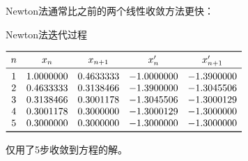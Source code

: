 \documentclass{ctexart}
\begin{document}
Newton法通常比之前的两个线性收敛方法更快：

\begin{table}[htpb]
\centering
\caption{Newton法迭代过程}
$\begin{array}{ccccc}
    \toprule
n & x_n & x_{n+1} & x'_n & x'_{n+1} \\
\midrule
 1 & 1.0000000 & 0.4633333 & -1.0000000 & -1.3900000 \\
 2 & 0.4633333 & 0.3138466 & -1.3900000 & -1.3045506 \\
 3 & 0.3138466 & 0.3001178 & -1.3045506 & -1.3000129 \\
 4 & 0.3001178 & 0.3000000 & -1.3000129 & -1.3000000 \\
 5 & 0.3000000 & 0.3000000 & -1.3000000 & -1.3000000 \\
    \bottomrule
\end{array}\label{table:newton}$
\end{table}

仅用了5步收敛到方程的解。
\end{document}
